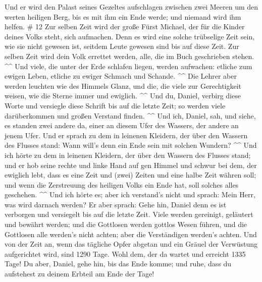  Und er wird den Palast seines Gezeltes aufschlagen
zwischen zwei Meeren um den werten heiligen Berg, bis es mit ihm ein
Ende werde; und niemand wird ihm helfen. \# 12  Zur selben
Zeit wird der große Fürst Michael, der für die Kinder deines Volks
steht, sich aufmachen. Denn es wird eine solche trübselige Zeit sein,
wie sie nicht gewesen ist, seitdem Leute gewesen sind bis auf diese
Zeit. Zur selben Zeit wird dein Volk errettet werden, alle, die im Buch
geschrieben stehen. \^{}\^{}  Und viele, die unter der
Erde schlafen liegen, werden aufwachen: etliche zum ewigen Leben,
etliche zu ewiger Schmach und Schande. \^{}\^{}  Die
Lehrer aber werden leuchten wie des Himmels Glanz, und die, die viele
zur Gerechtigkeit weisen, wie die Sterne immer und ewiglich. \^{}\^{}
 Und du, Daniel, verbirg diese Worte und versiegle diese
Schrift bis auf die letzte Zeit; so werden viele darüberkommen und
großen Verstand finden. \^{}\^{}  Und ich, Daniel, sah,
und siehe, es standen zwei andere da, einer an diesem Ufer des Wassers,
der andere an jenem Ufer.  Und er sprach zu dem in
leinenen Kleidern, der über den Wassern des Flusses stand: Wann will's
denn ein Ende sein mit solchen Wundern? \^{}\^{}  Und ich
hörte zu dem in leinenen Kleidern, der über den Wassern des Flusses
stand; und er hob seine rechte und linke Hand auf gen Himmel und schwur
bei dem, der ewiglich lebt, dass es eine Zeit und (zwei) Zeiten und eine
halbe Zeit währen soll; und wenn die Zerstreuung des heiligen Volks ein
Ende hat, soll solches alles geschehen. \^{}\^{}  Und ich
hörte es; aber ich verstand's nicht und sprach: Mein Herr, was wird
darnach werden?  Er aber sprach: Gehe hin, Daniel denn es
ist verborgen und versiegelt bis auf die letzte Zeit. 
Viele werden gereinigt, geläutert und bewährt werden; und die Gottlosen
werden gottlos Wesen führen, und die Gottlosen alle werden's nicht
achten; aber die Verständigen werden's achten.  Und von
der Zeit an, wenn das tägliche Opfer abgetan und ein Gräuel der
Verwüstung aufgerichtet wird, sind 1290 Tage.  Wohl dem,
der da wartet und erreicht 1335 Tage!  Du aber, Daniel,
gehe hin, bis das Ende komme; und ruhe, dass du aufstehest zu deinem
Erbteil am Ende der Tage!
